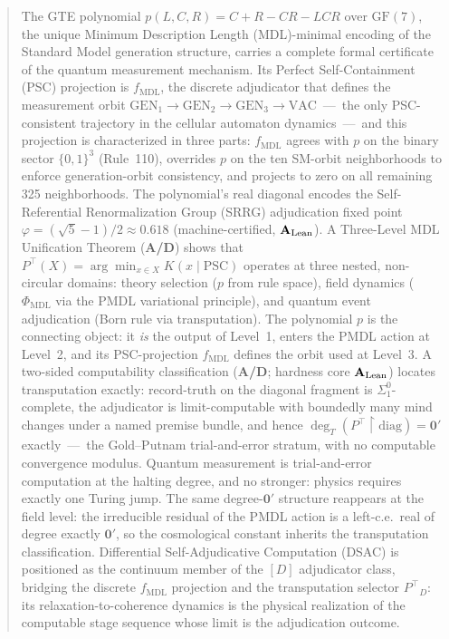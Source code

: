\documentclass[11pt]{article}
\theoremstyle{remark}
\newcommand{\PHIMDL}{\ensuremath{\Phi_{\mathrm{MDL}}}}
\newcommand{\GF}[1]{\ensuremath{\mathrm{GF}(#1)}}
\newcommand{\fmdl}{\ensuremath{f_{\mathrm{MDL}}}}
\newcommand{\Ptop}{\ensuremath{P^{\top}}}
\newcommand{\CatAL}{\ensuremath{\textbf{A}_{\rm Lean}}}
\newcommand{\CatAD}{\textbf{A/D}}
\begin{document}
\begin{abstract}
The GTE polynomial $p(L,C,R) = C+R-CR-LCR$ over $\GF{7}$, the unique
Minimum Description Length (MDL)-minimal encoding of the Standard Model
generation structure, carries a complete formal certificate of the quantum
measurement mechanism.
Its Perfect Self-Containment (PSC) projection is \fmdl{}, the discrete
adjudicator that defines the measurement orbit
$\mathrm{GEN}_1 \to \mathrm{GEN}_2 \to \mathrm{GEN}_3 \to \mathrm{VAC}$~---~the
only PSC-consistent trajectory in the cellular automaton dynamics~---~and
this projection is characterized in three parts: \fmdl{} agrees with $p$ on
the binary sector $\{0,1\}^3$ (Rule~110), overrides $p$ on the ten
SM-orbit neighborhoods to enforce generation-orbit consistency, and projects
to zero on all remaining 325 neighborhoods.
The polynomial's real diagonal encodes the Self-Referential Renormalization
Group (SRRG) adjudication fixed point $\varphi = (\sqrt{5}-1)/2 \approx 0.618$
(machine-certified, \CatAL).
A Three-Level MDL Unification Theorem (\CatAD) shows that
$\Ptop(X) = \arg\min_{x \in X} K(x \mid \text{PSC})$ operates at three nested,
non-circular domains: theory selection ($p$ from rule space), field dynamics
($\PHIMDL$ via the PMDL variational principle), and quantum event adjudication
(Born rule via transputation).
The polynomial $p$ is the connecting object: it \emph{is} the output of
Level~1, enters the PMDL action at Level~2, and its PSC-projection \fmdl{}
defines the orbit used at Level~3.
A two-sided computability classification (\CatAD{}; hardness core \CatAL)
locates transputation exactly: record-truth on the diagonal fragment is
$\Sigma^0_1$-complete, the adjudicator is limit-computable with boundedly
many mind changes under a named premise bundle, and hence
$\deg_T(\Ptop{\upharpoonright}\mathrm{diag}) = \mathbf{0}'$ exactly~---~the
Gold--Putnam trial-and-error stratum, with no computable convergence
modulus. Quantum measurement is trial-and-error computation at the halting
degree, and no stronger: physics requires exactly one Turing jump.
The same degree-$\mathbf{0}'$ structure reappears at the field level: the
irreducible residual of the PMDL action is a left-c.e.\ real of degree
exactly $\mathbf{0}'$, so the cosmological constant inherits the
transputation classification.
Differential Self-Adjudicative Computation (DSAC) is positioned as the
continuum member of the $[D]$ adjudicator class, bridging the discrete
\fmdl{} projection and the transputation selector $\Ptop_D$: its
relaxation-to-coherence dynamics is the physical realization of the
computable stage sequence whose limit is the adjudication outcome.
\end{abstract}
\end{document}
